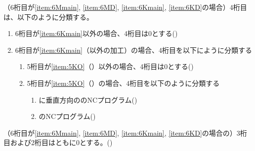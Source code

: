 （6桁目が\ref{item:6Mmain}, \ref{item:6MD}, \ref{item:6Kmain}, \ref{item:6KD}の場合）4桁目は、以下のように分類する。
\begin{enumerate}[label=\alph*), ref=\alph*)]
\item 6桁目が\ref{item:6Kmain}\hx 以外の場合、4桁目は0とする({})
\item 6桁目が\ref{item:6Kmain}（\Dimple 以外の加工）の場合、4桁目を以下にように分類する
  \begin{enumerate}[label=\alph{enumi}\,-\arabic*), leftmargin=\leftmargini]
  \item 5桁目が\ref{item:5KO}（\OutcutMilling）以外の場合、4桁目は0とする({})
  \item 5桁目が\ref{item:5KO}（\OutcutMilling）の場合、4桁目を以下のように分類する
    \begin{enumerate}[label=\arabic*., ref=\arabic*, start=0, leftmargin=*]
    \item \EndFace に垂直方向の\OutcutMilling のNCプログラム({})
    \item \CurvedOutcutMilling のNCプログラム({})
    \end{enumerate}
  \end{enumerate}
\end{enumerate}



（6桁目が\ref{item:6Mmain}, \ref{item:6MD}, \ref{item:6Kmain}, \ref{item:6KD}\hx の場合の）3桁目および2桁目はともに0とする。({})


